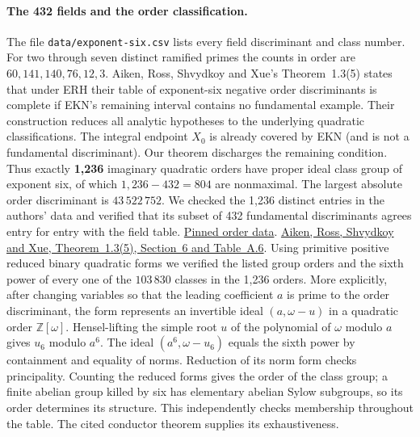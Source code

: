 \paragraph{The 432 fields and the order classification.}
The file \texttt{data/exponent-six.csv} lists every field discriminant and class number. For two through seven distinct ramified primes the counts in order are $60,141,140,76,12,3$. Aiken, Ross, Shvydkoy and Xue's Theorem~1.3(5) states that under ERH their table of exponent-six negative order discriminants is complete if EKN's remaining interval contains no fundamental example. Their construction reduces all analytic hypotheses to the underlying quadratic classifications. The integral endpoint $X_0$ is already covered by EKN (and is not a fundamental discriminant). Our theorem discharges the remaining condition. Thus exactly \textbf{1,236} imaginary quadratic orders have proper ideal class group of exponent six, of which $1,236-432=804$ are nonmaximal. The largest absolute order discriminant is $43\,522\,752$. We checked the 1,236 distinct entries in the authors' data and verified that its subset of 432 fundamental discriminants agrees entry for entry with the field table.
\href{https://github.com/erick-ross/research-data/blob/119301b8bcae42a891062d4877b77b6dbc8e820f/class-groups-small-exp/Table-6.txt}{Pinned order data}.
\href{https://arxiv.org/pdf/2605.26020}{Aiken, Ross, Shvydkoy and Xue, Theorem~1.3(5), Section~6 and Table~A.6}.
Using primitive positive reduced binary quadratic forms we verified the listed group orders and the sixth power of every one of the $103\,830$ classes in the 1,236 orders. More explicitly, after changing variables so that the leading coefficient $a$ is prime to the order discriminant, the form represents an invertible ideal $(a,\omega-u)$ in a quadratic order $\mathbb Z[\omega]$. Hensel-lifting the simple root $u$ of the polynomial of $\omega$ modulo $a$ gives $u_6$ modulo $a^6$. The ideal $(a^6,\omega-u_6)$ equals the sixth power by containment and equality of norms. Reduction of its norm form checks principality. Counting the reduced forms gives the order of the class group; a finite abelian group killed by six has elementary abelian Sylow subgroups, so its order determines its structure. This independently checks membership throughout the table. The cited conductor theorem supplies its exhaustiveness.

